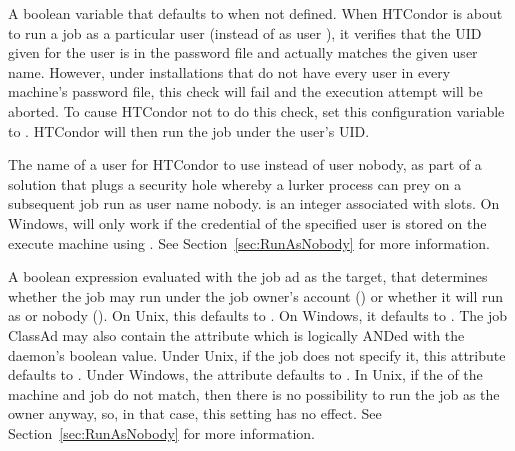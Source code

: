 \begin{description}
\label{param:SoftUidDomain}
\item[\Macro{SOFT\_UID\_DOMAIN}]
  A boolean variable that defaults to  when not defined.
  When HTCondor is about to run a job as a particular user 
  (instead of as user ),
  it verifies that the UID given for the user is in the
  password file and actually matches the given user name.
  However, under installations that do not have every user
  in every machine's password file,
  this check will fail and the execution attempt will be aborted.
  To cause HTCondor not to do
  this check, set this configuration variable to .
  HTCondor will then run the job under the user's UID.

\label{param:SlotNUser}
\item[\Macro{SLOT<N>\_USER}]
  The name of a user for HTCondor to use instead of
  user nobody,
  as part of a solution that plugs a security hole whereby
  a lurker process can prey on a subsequent job run as user name nobody. 
   is an integer associated with slots.
  On Windows, 
  will only work if the credential of the specified
  user is stored on the execute machine using .
  See Section~\ref{sec:RunAsNobody} for more information.

\label{param:StarterAllowRunAsOwner}
\item[\Macro{STARTER\_ALLOW\_RUNAS\_OWNER}]
  A boolean expression evaluated with the job ad as the
  target, that determines whether the job may run under the job owner's
  account () or whether it will run as  or
  nobody ().  On Unix, this defaults to .
  On Windows, it defaults to .
  The job ClassAd may also contain the attribute
   which is logically ANDed with the  daemon's
  boolean value.  Under Unix, if the job does not specify it, this
  attribute defaults to .
  Under Windows, the attribute defaults to .
  In Unix, if the  of the machine and job do not
  match, then there is no possibility to run the job as the owner
  anyway, so, in that case, this setting has no effect.  See
  Section~\ref{sec:RunAsNobody} for more information.


\end{description}
